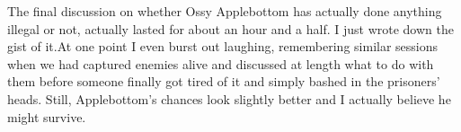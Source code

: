 The final discussion on whether Ossy Applebottom has actually done anything illegal or not, actually lasted for about an hour and a half. I just wrote down the gist of it.At one point I even burst out laughing, remembering similar sessions when we had captured enemies alive and discussed at length what to do with them before someone finally got tired of it and simply bashed in the prisoners' heads. Still, Applebottom's chances look slightly better and I actually believe he might survive. 